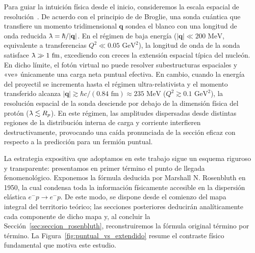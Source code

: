 \documentclass[10pt,a4paper]{article}
\newcommand{\lambdabar}{\mathchar'26\mkern-9mu\lambda}
\begin{document}
Para guiar la intuición física desde el inicio, consideremos la escala espacial de resolución~\cite{das2003,henley2007}. De acuerdo con el principio de de Broglie, una sonda cuántica que transfiere un momento tridimensional $\mathbf{q}$ sondea el blanco con una longitud de onda reducida $\lambdabar = \hbar / |\mathbf{q}|$. En el régimen de baja energía ($|\mathbf{q}| \ll 200\text{ MeV}$, equivalente a transferencias $Q^2 \ll 0.05\text{ GeV}^2$), la longitud de onda de la sonda satisface $\lambdabar \gg 1\text{ fm}$, excediendo con creces la extensión espacial típica del nucleón. En dicho límite, el fotón virtual no puede resolver subestructuras espaciales y «ve» únicamente una carga neta puntual efectiva. En cambio, cuando la energía del proyectil se incrementa hasta el régimen ultra-relativista y el momento transferido alcanza $|\mathbf{q}| \gtrsim \hbar c / (0.84\text{ fm}) \approx 235\text{ MeV}$ ($Q^2 \gtrsim 0.1\text{ GeV}^2$), la resolución espacial de la sonda desciende por debajo de la dimensión física del protón ($\lambdabar \lesssim R_p$). En este régimen, las amplitudes dispersadas desde distintas regiones de la distribución interna de carga y corriente interfieren destructivamente, provocando una caída pronunciada de la sección eficaz con respecto a la predicción para un fermión puntual.

La estrategia expositiva que adoptamos en este trabajo sigue un esquema riguroso y transparente: presentamos en primer término el punto de llegada fenomenológico. Exponemos la fórmula deducida por Marshall N. Rosenbluth en 1950, la cual condensa toda la información físicamente accesible en la dispersión elástica $e^- p \to e^- p$. De este modo, se dispone desde el comienzo del mapa integral del territorio teórico; las secciones posteriores deducirán analíticamente cada componente de dicho mapa y, al concluir la Sección~\ref{sec:seccion_rosenbluth}, reconstruiremos la fórmula original término por término. La Figura~\ref{fig:puntual_vs_extendido} resume el contraste físico fundamental que motiva este estudio.
\end{document}
